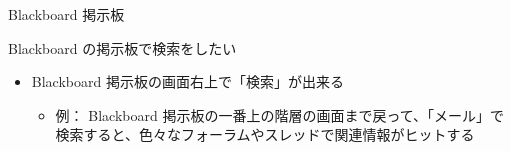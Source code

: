 \documentclass[a4j,10pt]{jsarticle}
\def\lthtmlcheckvsize{\ifdim\ht\sizebox<\vsize 
  \ifdim\wd\sizebox<\hsize\expandafter\hfill\fi \expandafter\vfill
  \else\expandafter\vss\fi}%
\begin{document}
{\newpage\clearpage
{}%
\begin{frame}[label={sec:orgdf0337d},fragile]{Blackboard 掲示板}
\begin{block}{Blackboard の掲示板で検索をしたい}
\begin{itemize}
\item Blackboard 掲示板の画面右上で「検索」が出来る
\begin{itemize}
\item 例： Blackboard 掲示板の一番上の階層の画面まで戻って、「メール」で検索すると、色々なフォーラムやスレッドで関連情報がヒットする
\end{itemize}
\end{itemize}
\end{block}
\end{frame}%
\lthtmlfigureZ
\lthtmlcheckvsize\clearpage}
\end{document}
